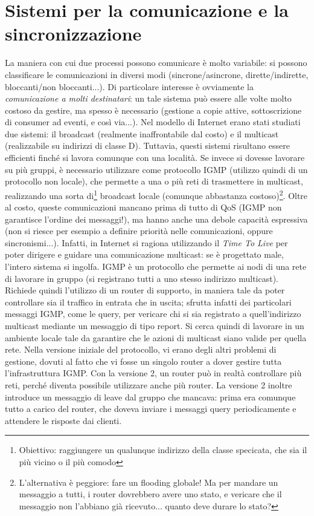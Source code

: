 \section{Sistemi per la comunicazione e la sincronizzazione}
La maniera con cui due processi possono comunicare è molto variabile: si possono classificare le comunicazioni in
diversi modi (sincrone/asincrone, dirette/indirette, bloccanti/non bloccanti...). Di particolare interesse è
ovviamente la \textit{comunicazione a molti destinatari}: un tale sistema può essere alle volte molto costoso da
gestire, ma spesso è necessario (gestione a copie attive, sottoscrizione di consumer ad eventi, e così via...).
Nel modello di Internet erano stati studiati due sistemi: il broadcast (realmente inaffrontabile dal costo) e
il multicast (realizzabile su indirizzi di classe D). Tuttavia, questi sistemi risultano essere efficienti finché si
lavora comunque con una località. Se invece si dovesse lavorare su più gruppi, è necessario utilizzare come protocollo
IGMP (utilizzo quindi di un protocollo non locale), che permette a una o più reti di trasmettere in multicast,
realizzando una sorta di\footnote{Obiettivo: raggiungere un qualunque indirizzo della classe specicata, che sia il più
vicino o il più comodo} broadcast locale (comunque abbastanza costoso)\footnote{L'alternativa è peggiore: fare un
flooding globale! Ma per mandare un messaggio a tutti, i router dovrebbero avere uno stato, e vericare che il messaggio
non l'abbiano già ricevuto... quanto deve durare lo stato?}. Oltre al costo, queste comunicazioni mancano prima di 
tutto di QoS (IGMP non garantisce l'ordine dei messaggi!), ma hanno anche una debole capacità espressiva (non si riesce
per esempio a definire priorità nelle comunicazioni, oppure sincronismi...). Infatti, in Internet si ragiona utilizzando
il \textit{Time To Live} per poter dirigere e guidare una comunicazione multicast: se è progettato male, l'intero
sistema si ingolfa. 
IGMP è un protocollo che permette ai nodi di una rete di lavorare in gruppo (si registrano tutti a uno stesso indirizzo
multicast). Richiede quindi l'utilizzo di un router di supporto, in maniera tale da poter controllare sia il traffico in
entrata che in uscita; sfrutta infatti dei particolari messaggi IGMP, come le query, per vericare chi si sia registrato
a quell'indirizzo multicast mediante un messaggio di tipo report. Si cerca quindi di lavorare in un ambiente locale tale
da garantire che le azioni di multicast siano valide per quella rete.
Nella versione iniziale del protocollo, vi erano degli altri problemi di gestione, dovuti al fatto che vi fosse un
singolo router a dover gestire tutta l'infrastruttura IGMP. Con la versione 2, un router può in realtà controllare più
reti, perché diventa possibile utilizzare anche più router. La versione 2 inoltre introduce un messaggio di leave dal
gruppo che mancava: prima era comunque tutto a carico del router, che doveva inviare i messaggi query periodicamente
e attendere le risposte dai clienti.
